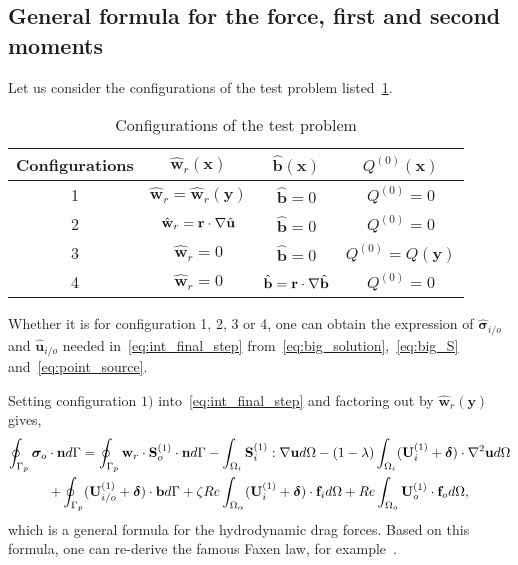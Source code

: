 \subsection{General formula for the force, first and second moments}
Let us consider the configurations of the test problem listed~\ref{tab:textproblem}.
\begin{table}
    \caption{Configurations of the test problem}
    \label{tab:textproblem}
    \begin{center}        
    \begin{tabular}{|cccc|}\hline
        Configurations & $\hat{\textbf{w}}_r(\textbf{x})$&$\hat{\textbf{b}}(\textbf{x})$ & $Q^{(0)}(\textbf{x})$\\ \hline
        1 & $\hat{\textbf{w}}_r = \hat{\textbf{w}}_r(\textbf{y})$& $\hat{\textbf{b}} = 0$ & $Q^{(0)}= 0$\\
        2 & $\hat{\textbf{w}}_r = \textbf{r}\cdot \mathbf{\nabla} \hat{\textbf{u}}$& $\hat{\textbf{b}} = 0$ & $Q^{(0)}= 0$\\
        3 & $\hat{\textbf{w}}_r = 0$& $\hat{\textbf{b}} = 0$ & $Q^{(0)}=Q(\textbf{y}) $\\
        4 & $\hat{\textbf{w}}_r = 0$& $\hat{\textbf{b}} = \textbf{r}\cdot \mathbf{\nabla}\hat{\textbf{b}}$ & $Q^{(0)}= 0$\\ \hline
    \end{tabular}
    \end{center}
\end{table}
Whether it is for configuration 1, 2, 3 or 4, one can obtain the expression of $\hat{\bm\sigma}_{i/o}$ and $\hat{\textbf{u}}_{i/o}$ needed in~\ref{eq:int_final_step} from~\ref{eq:big_solution},~\ref{eq:big_S} and~\ref{eq:point_source}. 

Setting configuration $1)$ into~\ref{eq:int_final_step} and factoring out by $\hat{\textbf{w}}_r(\textbf{y})$ gives, 
\begin{multline}
    \intS[p]{\bm\sigma_{o}\cdot \textbf{n}}
    =
    \intS[p]{\textbf{w}_{r}\cdot \textbf{S}_{o}^{(1)}\cdot \textbf{n}}
    - \intO[i]{ \textbf{S}_{i}^{(1)} :\grad\textbf{u}}
    - (1-\lambda) \intO[i]{(\textbf{U}_{i}^{(1)} + \bm\delta) \cdot \grad^2 \textbf{u} }\\ 
    + \intS[p]{(\textbf{U}_{i/o}^{(1)} + \bm\delta) \cdot  \textbf{b}}
    + \zeta Re \intO{(\textbf{U}_{i}^{(1)} + \bm\delta)\cdot \textbf{f}_{i}} 
    + Re\intO[o]{\textbf{U}_{o}^{(1)}\cdot \textbf{f}_{o}},
    \label{eq:drag_force}
\end{multline}
which is a general formula for the hydrodynamic drag forces. 
Based on this formula, one can re-derive the famous Faxen law, for example~\citep{stone2001inertial}. 

